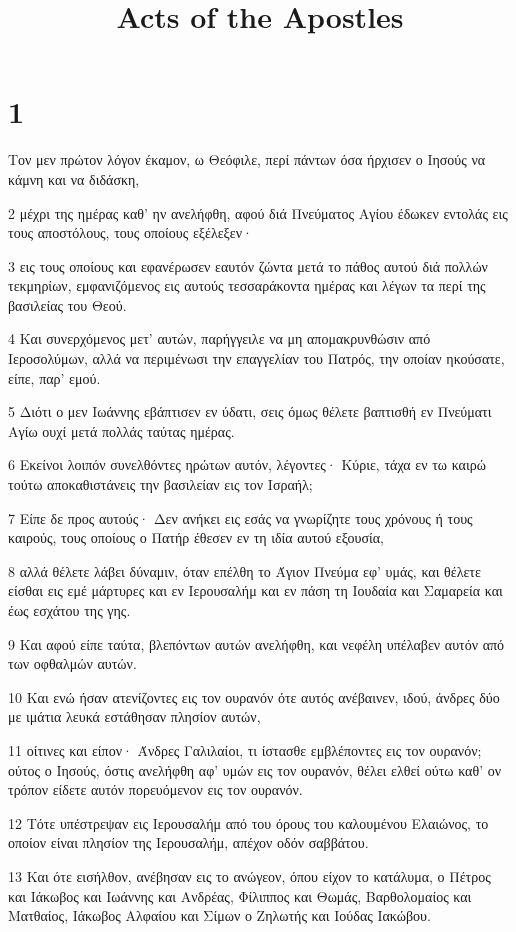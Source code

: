 

\title{Acts of the Apostles}


\chapter{1}

\par Τον μεν πρώτον λόγον έκαμον, ω Θεόφιλε, περί πάντων όσα ήρχισεν ο Ιησούς να κάμνη και να διδάσκη,
\par 2 μέχρι της ημέρας καθ' ην ανελήφθη, αφού διά Πνεύματος Αγίου έδωκεν εντολάς εις τους αποστόλους, τους οποίους εξέλεξεν·
\par 3 εις τους οποίους και εφανέρωσεν εαυτόν ζώντα μετά το πάθος αυτού διά πολλών τεκμηρίων, εμφανιζόμενος εις αυτούς τεσσαράκοντα ημέρας και λέγων τα περί της βασιλείας του Θεού.
\par 4 Και συνερχόμενος μετ' αυτών, παρήγγειλε να μη απομακρυνθώσιν από Ιεροσολύμων, αλλά να περιμένωσι την επαγγελίαν του Πατρός, την οποίαν ηκούσατε, είπε, παρ' εμού.
\par 5 Διότι ο μεν Ιωάννης εβάπτισεν εν ύδατι, σεις όμως θέλετε βαπτισθή εν Πνεύματι Αγίω ουχί μετά πολλάς ταύτας ημέρας.
\par 6 Εκείνοι λοιπόν συνελθόντες ηρώτων αυτόν, λέγοντες· Κύριε, τάχα εν τω καιρώ τούτω αποκαθιστάνεις την βασιλείαν εις τον Ισραήλ;
\par 7 Είπε δε προς αυτούς· Δεν ανήκει εις εσάς να γνωρίζητε τους χρόνους ή τους καιρούς, τους οποίους ο Πατήρ έθεσεν εν τη ιδία αυτού εξουσία,
\par 8 αλλά θέλετε λάβει δύναμιν, όταν επέλθη το Άγιον Πνεύμα εφ' υμάς, και θέλετε είσθαι εις εμέ μάρτυρες και εν Ιερουσαλήμ και εν πάση τη Ιουδαία και Σαμαρεία και έως εσχάτου της γης.
\par 9 Και αφού είπε ταύτα, βλεπόντων αυτών ανελήφθη, και νεφέλη υπέλαβεν αυτόν από των οφθαλμών αυτών.
\par 10 Και ενώ ήσαν ατενίζοντες εις τον ουρανόν ότε αυτός ανέβαινεν, ιδού, άνδρες δύο με ιμάτια λευκά εστάθησαν πλησίον αυτών,
\par 11 οίτινες και είπον· Άνδρες Γαλιλαίοι, τι ίστασθε εμβλέποντες εις τον ουρανόν; ούτος ο Ιησούς, όστις ανελήφθη αφ' υμών εις τον ουρανόν, θέλει ελθεί ούτω καθ' ον τρόπον είδετε αυτόν πορευόμενον εις τον ουρανόν.
\par 12 Τότε υπέστρεψαν εις Ιερουσαλήμ από του όρους του καλουμένου Ελαιώνος, το οποίον είναι πλησίον της Ιερουσαλήμ, απέχον οδόν σαββάτου.
\par 13 Και ότε εισήλθον, ανέβησαν εις το ανώγεον, όπου είχον το κατάλυμα, ο Πέτρος και Ιάκωβος και Ιωάννης και Ανδρέας, Φίλιππος και Θωμάς, Βαρθολομαίος και Ματθαίος, Ιάκωβος Αλφαίου και Σίμων ο Ζηλωτής και Ιούδας Ιακώβου.
